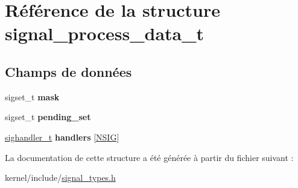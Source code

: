\hypertarget{structsignal__process__data__t}{\section{Référence de la structure signal\-\_\-process\-\_\-data\-\_\-t}
\label{structsignal__process__data__t}
}
\subsection*{Champs de données}
\begin{DoxyCompactItemize}
\item 
\hypertarget{structsignal__process__data__t_a397d720abbb70447cb1837012fa808e8}{sigset\-\_\-t {\bfseries mask}}\label{structsignal__process__data__t_a397d720abbb70447cb1837012fa808e8}

\item 
\hypertarget{structsignal__process__data__t_a072dbf9762b10b9b8b545622fcbfef92}{sigset\-\_\-t {\bfseries pending\-\_\-set}}\label{structsignal__process__data__t_a072dbf9762b10b9b8b545622fcbfef92}

\item 
\hypertarget{structsignal__process__data__t_acfd78d7210d6b09d6ffcf8d5c0ed8c24}{\hyperlink{signal_8h_a564498016effaee1f3384e07b7ced24f}{sighandler\-\_\-t} {\bfseries handlers} \mbox{[}\hyperlink{signal_8h_ab83b88daaecc469d1edb90a527ab4a39}{N\-S\-I\-G}\mbox{]}}\label{structsignal__process__data__t_acfd78d7210d6b09d6ffcf8d5c0ed8c24}

\end{DoxyCompactItemize}


La documentation de cette structure a été générée à partir du fichier suivant \-:\begin{DoxyCompactItemize}
\item 
kernel/include/\hyperlink{signal__types_8h}{signal\-\_\-types.\-h}\end{DoxyCompactItemize}
